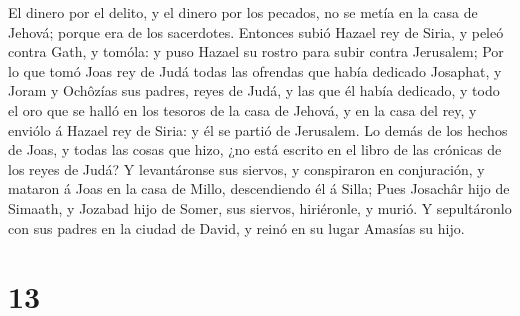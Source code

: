  El dinero por el delito, y el dinero por los pecados, no
se metía en la casa de Jehová; porque era de los sacerdotes.
 Entonces subió Hazael rey de Siria, y peleó contra Gath,
y tomóla: y puso Hazael su rostro para subir contra Jerusalem;
 Por lo que tomó Joas rey de Judá todas las ofrendas que
había dedicado Josaphat, y Joram y Ochôzías sus padres, reyes de Judá, y
las que él había dedicado, y todo el oro que se halló en los tesoros de
la casa de Jehová, y en la casa del rey, y enviólo á Hazael rey de
Siria: y él se partió de Jerusalem.  Lo demás de los
hechos de Joas, y todas las cosas que hizo, ¿no está escrito en el libro
de las crónicas de los reyes de Judá?  Y levantáronse sus
siervos, y conspiraron en conjuración, y mataron á Joas en la casa de
Millo, descendiendo él á Silla;  Pues Josachâr hijo de
Simaath, y Jozabad hijo de Somer, sus siervos, hiriéronle, y murió. Y
sepultáronlo con sus padres en la ciudad de David, y reinó en su lugar
Amasías su hijo.

\hypertarget{section-12}{%
\section{13}\label{section-12}}

